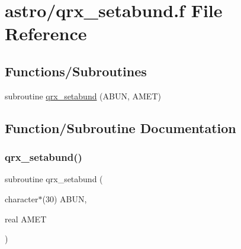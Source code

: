 \hypertarget{qrx__setabund_8f}{}\section{astro/qrx\+\_\+setabund.f File Reference}
\label{qrx__setabund_8f}
\subsection*{Functions/\+Subroutines}
\begin{DoxyCompactItemize}
\item 
subroutine \hyperlink{qrx__setabund_8f_a1f1dcdce812d7dc98530a4921fe9f6b5}{qrx\+\_\+setabund} (A\+B\+UN, A\+M\+ET)
\end{DoxyCompactItemize}


\subsection{Function/\+Subroutine Documentation}
\mbox{\label{qrx__setabund_8f_a1f1dcdce812d7dc98530a4921fe9f6b5}} 
\subsubsection{\texorpdfstring{qrx\+\_\+setabund()}{qrx\_setabund()}}
{\footnotesize\ttfamily subroutine qrx\+\_\+setabund (\begin{DoxyParamCaption}\item[{character$\ast$(30)}]{A\+B\+UN,  }\item[{real}]{A\+M\+ET }\end{DoxyParamCaption})}

